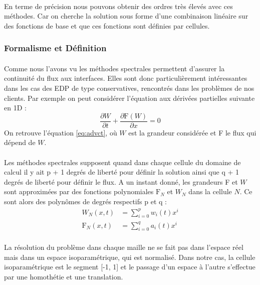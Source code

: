     \paragraph{}
    En terme de précision nous pouvons obtenir des ordres très élevés avec ces méthodes. Car on cherche la solution sous forme d'une combinaison linéaire sur des fonctions de base et que ces fonctions sont définies par cellules. 

    \subsubsection{Formalisme et Définition}
    \paragraph{}
    Comme nous l'avons vu les méthodes spectrales permettent d'assurer la continuité du flux aux interfaces. Elles sont donc particulièrement intéressantes dans les cas des EDP de type conservatives, rencontrés dans les problèmes de nos clients. Par exemple on peut considérer l'équation aux dérivées partielles suivante en 1D :
    $$\frac{\partial W}{\partial t} + \frac{\partial \mathrm{F}\left(W\right)}{\partial x} = 0$$
    On retrouve l'équation \ref{eq:advct}, où $W$ est la grandeur considérée et F le flux qui dépend de $W$.
    \paragraph{}
    Les méthodes spectrales supposent quand dans chaque cellule du domaine de calcul il y ait p + 1 degrés de liberté pour définir la solution ainsi que q + 1 degrés de liberté pour définir le flux. A un instant donné, les grandeurs F et $W$ sont approximées par des fonctions polynomiales $\mathrm{F}_N$ et $W_N$ dans la cellule $N$. Ce sont alors des polynômes de degrés respectifs p et q :
    \begin{equation}
    \begin{split}
        W_N\left(x, t\right) &= \sum_{i = 0}^p w_i\left(t\right)x^i \\
            \mathrm{F}_N\left(x, t\right) &= \sum_{i = 0}^q a_i\left(t\right)x^i
    \end{split}
    \label{eq:sol_flux_as_polynomials}
    \end{equation}
    \paragraph{}
    La résolution du problème dans chaque maille ne se fait pas dans l'espace réel mais dans un espace isoparamétrique, qui est normalisé. Dans notre cas, la cellule isoparamétrique est le segment [-1, 1] et le passage d'un espace à l'autre s'effectue par une homothétie et une translation. 
